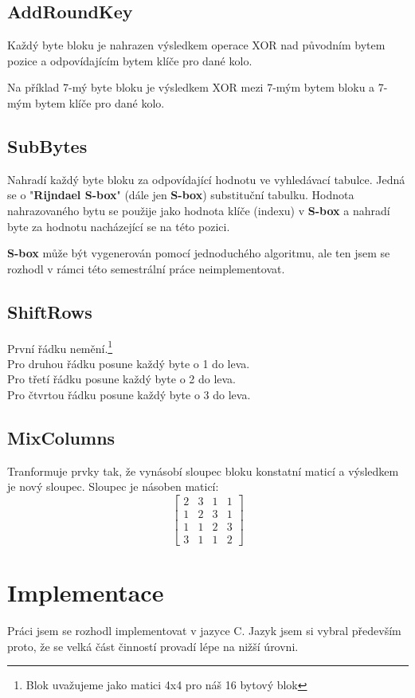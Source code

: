 \documentclass[12pt]{article}
\begin{document}
\subsection{AddRoundKey}
Každý byte bloku je nahrazen výsledkem operace XOR nad původním bytem pozice a
odpovídajícím bytem klíče pro dané kolo.

Na příklad 7-mý byte bloku je výsledkem XOR mezi 7-mým bytem bloku a 7-mým bytem
klíče pro dané kolo.
%
\subsection{SubBytes}
Nahradí každý byte bloku za odpovídající hodnotu ve vyhledávací tabulce. Jedná
se o "\textbf{Rijndael S-box}" (dále jen \textbf{S-box}) substituční tabulku.
Hodnota nahrazovaného bytu se použije jako hodnota klíče (indexu) v 
\textbf{S-box} a nahradí byte za hodnotu nacházející se na této pozici.

\textbf{S-box} může být vygenerován pomocí jednoduchého algoritmu, ale ten
jsem se rozhodl v rámci této semestrální práce neimplementovat.
%
\subsection{ShiftRows}
\noindent První řádku nemění.\footnote{Blok uvažujeme jako matici 4x4 pro náš
	16 bytový blok}\\
Pro druhou řádku posune každý byte o 1 do leva.\\
Pro třetí řádku posune každý byte o 2 do leva.\\
Pro čtvrtou řádku posune každý byte o 3 do leva.\\
%
\subsection{MixColumns}
Tranformuje prvky tak, že vynásobí sloupec bloku konstatní maticí a výsledkem
je nový sloupec. Sloupec je násoben maticí:
\begin{equation*}
	\begin{bmatrix}
		2 & 3 & 1 & 1\\
		1 & 2 & 3 & 1\\
		1 & 1 & 2 & 3\\
		3 & 1 & 1 & 2
	\end{bmatrix}
\end{equation*}
\pagebreak
%
%
\section{Implementace}
Práci jsem se rozhodl implementovat v jazyce C. Jazyk jsem si vybral především
proto, že se velká část činností provadí lépe na nižší úrovni.
\end{document}

